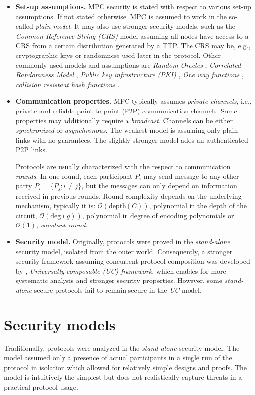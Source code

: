 \documentclass[
  digital, %
  twoside, %
  table,   %
  lof,     %
  lot,     %
]{fithesis3}
\newcommand{\itembf}[1]{\item {\bf{#1}}}
\newcommand{\bigO}[0]{\mathcal{O}}
\theoremstyle{definition}
\theoremstyle{remark}
\begin{document}
\begin{itemize}
    \itembf{Set-up assumptions.} MPC security is stated with respect to various set-up assumptions. If not stated otherwise, MPC is assumed to work in the so-called \emph{plain model}. It may also use stronger security models, such as the \emph{Common Reference String (CRS)} model \cite{CF01,DN02} assuming all nodes have access to a CRS from a certain distribution generated by a TTP. The CRS may be, e.g., cryptographic keys or randomness used later in the protocol. Other commonly used models and assumptions are \emph{Random Oracles} \cite{HM04}, \emph{Correlated Randomness Model} \cite{FGMR02, FWW04, IKMOP13}, \emph{Public key infrastructure (PKI)} \cite{BCNP04}, \emph{One way functions} \cite{IL89, KL07}, \emph{collision resistant hash functions} \cite{KL07, GMS08}.
    
    \itembf{Communication properties.} MPC typically assumes \emph{private channels}, i.e., private and reliable point-to-point (P2P) communication channels. Some properties may additionally require a \emph{broadcast}. Channels can be either \emph{synchronized} or \emph{asynchronous}. The weakest model is assuming only plain links with no guarantees. The slightly stronger model adds an authenticated P2P links.
    
    Protocols are usually characterized with the respect to communication \emph{rounds}. In one round, each participant $P_i$ may send message to any other party $\overline{P_i} = \{P_j; i \neq j\}$, but the messages can only depend on information received in previous rounds. Round complexity depends on the underlying mechanism, typically it is: $\bigO(\text{depth}(C))$, polynomial in the depth of the circuit, $\bigO(\text{deg}(g))$, polynomial in degree of encoding polynomials or $\bigO(1)$, \emph{constant round}.
    
    \itembf{Security model.} Originally, protocols were proved in the \emph{stand-alone} security model, isolated from the outer world. Consequently, a stronger security framework assuming concurrent protocol composition was developed by \cite{Can01}, \emph{Universally composable (UC) framework}, which enables for more systematic analysis and stronger security properties. However, some \emph{stand-alone} secure protocols fail to remain secure in the \emph{UC} model.
    
\end{itemize}

\section{Security models}\label{sec:uc}%
Traditionally, protocols were analyzed in the \emph{stand-alone} security model. The model assumed only a presence of actual participants in a single run of the protocol in isolation which allowed for relatively simple designs and proofs. The model is intuitively the simplest but does not realistically capture threats in a practical protocol usage. 
\end{document}
